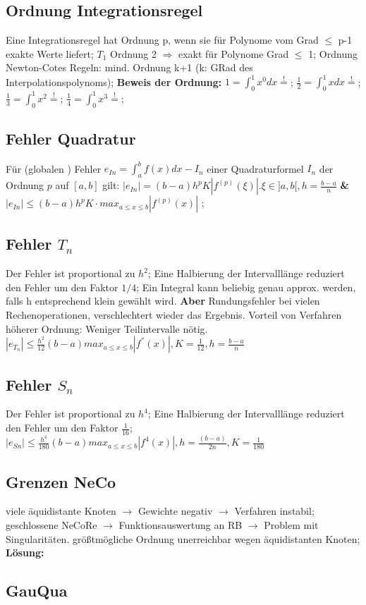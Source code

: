 \subsection{Ordnung Integrationsregel}
Eine Integrationsregel hat Ordnung p, wenn sie für Polynome vom Grad $\le$ p-1 exakte Werte liefert; $ T_{1} $ Ordnung 2 $\Rightarrow$ exakt für Polynome Grad $\le$ 1; 
Ordnung Newton-Cotes Regeln: mind. Ordnung k+1 (k: GRad des Interpolationspolynoms);
\textbf{Beweis der Ordnung:}
$ 1 = \int_{0}^{1} x^{0} dx \overset{!}{=} $; 
$ \frac{1}{2} = \int_{0}^{1} x dx \overset{!}{=} $; 
$ \frac{1}{3} = \int_{0}^{1} x^{2} \overset{!}{=} $; 
$ \frac{1}{4} = \int_{0}^{1} x^{3} \overset{!}{=} $; 
\subsection{Fehler Quadratur}
Für (globalen ) Fehler $ e_{In}  = \int_{a}^{b} f(x) dx -I_{n} $ einer Quadraturformel $I_{n} $ der Ordnung $ p$  auf $ [a,b] $ gilt: 
$ |e_{In} | = (b-a) h^{p}K|f^{ (p) } (\xi)| . \xi \in ]a,b[, h = \frac{ b-a }{ n}  $ \textbf{\&} 
$ |e_{In} | \le (b-a) h^{p} K \cdot max_{a \le x \le b} | f^{ (p) } (x) | $ ; 
\subsection{ Fehler $T_{n}$ }
Der Fehler ist proportional zu $ h^2 $; Eine Halbierung der Intervalllänge reduziert den Fehler um den Faktor $ 1 / 4 $; Ein Integral kann beliebig genau approx. werden, falls h entsprechend klein gewählt wird. \textbf{Aber} Rundungsfehler bei vielen Rechenoperationen, verschlechtert wieder das Ergebnis. Vorteil von Verfahren höherer Ordnung: Weniger Teilintervalle nötig.
$ |e_{T_n} | \le \frac{ h^2 }{12} (b-a) max_{a \le x \le b} | f^{''} (x) |, K =\frac{1}{12}, h = \frac{ b-a }{n} $

\subsection{Fehler $ S_{n} $}
Der Fehler ist proportional zu $ h^4 $; Eine Halbierung der Intervalllänge reduziert den Fehler um den Faktor $ \frac{1}{16} $;
$ | e_{Sn} | \le \frac{ h^{4} }{180} (b-a) max_{a \le x \le b} | f^{4} (x) |, h= \frac{(b-a)}{2n}, K = \frac{1}{180} $
\subsection{Grenzen NeCo}
viele äquidistante Knoten $\rightarrow$ Gewichte negativ $\rightarrow$ Verfahren instabil; 
geschlossene NeCoRe $\rightarrow$ Funktionsauswertung an RB $\rightarrow$ Problem mit Singularitäten.
größtmögliche Ordnung unerreichbar wegen äquidistanten Knoten; 
\textbf{Lösung:} 

\subsection{GauQua}